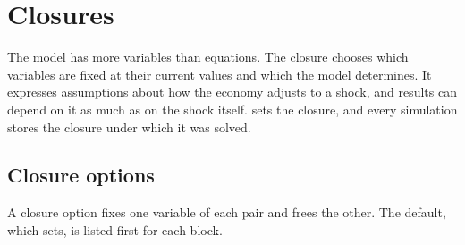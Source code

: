 \chapter{Closures}\label{chap:closures}

The model has more variables than equations. The closure chooses which
variables are fixed at their current values and which the model determines.
It expresses assumptions about how the economy adjusts to a shock, and results
can depend on it as much as on the shock itself.  sets the
closure, and every simulation stores the closure under which it was solved.

\section{Closure options}\label{sec:closure-options}

A closure option fixes one variable of each pair and frees the other. The
default, which  sets, is listed first for each block.


